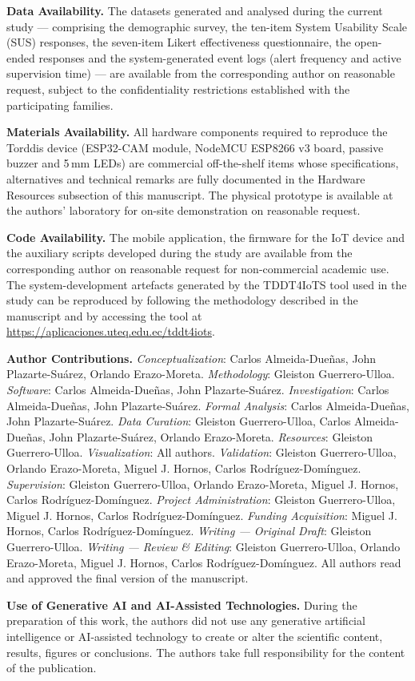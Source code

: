    \textbf{Data Availability.}
        The datasets generated and analysed during the current study --- comprising the demographic survey, the ten-item System Usability Scale (SUS) responses, the seven-item Likert effectiveness questionnaire, the open-ended responses and the system-generated event logs (alert frequency and active supervision time) --- are available from the corresponding author on reasonable request, subject to the confidentiality restrictions established with the participating families.

    \textbf{Materials Availability.}
        All hardware components required to reproduce the Torddis device (ESP32-CAM module, NodeMCU ESP8266 v3 board, passive buzzer and 5\,mm LEDs) are commercial off-the-shelf items whose specifications, alternatives and technical remarks are fully documented in the Hardware Resources subsection of this manuscript. The physical prototype is available at the authors' laboratory for on-site demonstration on reasonable request.

    \textbf{Code Availability.}
        The mobile application, the firmware for the IoT device and the auxiliary scripts developed during the study are available from the corresponding author on reasonable request for non-commercial academic use. The system-development artefacts generated by the TDDT4IoTS tool used in the study can be reproduced by following the methodology described in the manuscript and by accessing the tool at \url{https://aplicaciones.uteq.edu.ec/tddt4iots}.

    \textbf{Author Contributions.}
        \emph{Conceptualization}: Carlos Almeida-Due\~nas, John Plazarte-Su\'arez, Orlando Erazo-Moreta.
        \emph{Methodology}: Gleiston Guerrero-Ulloa.
        \emph{Software}: Carlos Almeida-Due\~nas, John Plazarte-Su\'arez.
        \emph{Investigation}: Carlos Almeida-Due\~nas, John Plazarte-Su\'arez.
        \emph{Formal Analysis}: Carlos Almeida-Due\~nas, John Plazarte-Su\'arez.
        \emph{Data Curation}: Gleiston Guerrero-Ulloa, Carlos Almeida-Due\~nas, John Plazarte-Su\'arez, Orlando Erazo-Moreta.
        \emph{Resources}: Gleiston Guerrero-Ulloa.
        \emph{Visualization}: All authors.
        \emph{Validation}: Gleiston Guerrero-Ulloa, Orlando Erazo-Moreta, Miguel J. Hornos, Carlos Rodr\'iguez-Dom\'inguez.
        \emph{Supervision}: Gleiston Guerrero-Ulloa, Orlando Erazo-Moreta, Miguel J. Hornos, Carlos Rodr\'iguez-Dom\'inguez.
        \emph{Project Administration}: Gleiston Guerrero-Ulloa, Miguel J. Hornos, Carlos Rodr\'iguez-Dom\'inguez.
        \emph{Funding Acquisition}: Miguel J. Hornos, Carlos Rodr\'iguez-Dom\'inguez.
        \emph{Writing --- Original Draft}: Gleiston Guerrero-Ulloa.
        \emph{Writing --- Review \& Editing}: Gleiston Guerrero-Ulloa, Orlando Erazo-Moreta, Miguel J. Hornos, Carlos Rodr\'iguez-Dom\'inguez.
        All authors read and approved the final version of the manuscript.

    \textbf{Use of Generative AI and AI-Assisted Technologies.}
        During the preparation of this work, the authors did not use any generative artificial intelligence or AI-assisted technology to create or alter the scientific content, results, figures or conclusions. The authors take full responsibility for the content of the publication.
